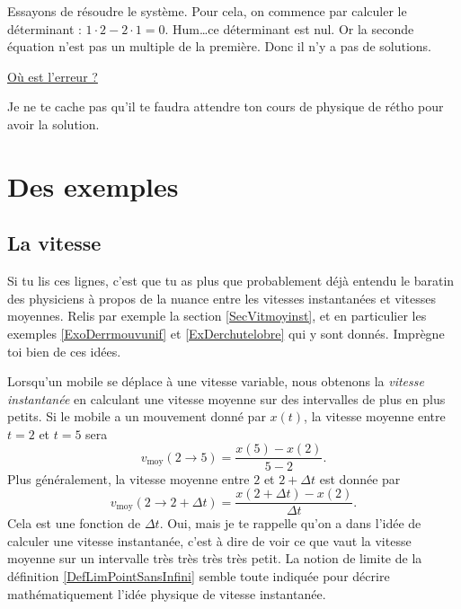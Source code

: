 \documentclass{article}
\begin{document}
Essayons de résoudre le système. Pour cela, on commence par calculer le déterminant : $1\cdot2-2\cdot 1=0$. Hum\ldots ce déterminant est nul. Or la seconde équation n'est pas un multiple de la première. Donc il n'y a pas de solutions.

 \href{http://fr.wikipedia.org/wiki/Liaison_nucléaire}{Où est l'erreur ?}

Je ne te cache pas qu'il te faudra attendre ton cours de physique de rétho pour avoir la solution.


					\section{Des exemples}

					\subsection{La vitesse}

Si tu lis ces lignes, c'est que tu as plus que probablement déjà entendu le baratin des physiciens à propos de la nuance entre les vitesses instantanées et vitesses moyennes. Relis par exemple la section \ref{SecVitmoyinst}, et en particulier les exemples \ref{ExoDerrmouvunif} et \ref{ExDerchutelobre} qui y sont donnés. Imprègne toi bien de ces idées.

Lorsqu'un mobile se déplace à une vitesse variable, nous obtenons la \emph{vitesse instantanée} en calculant une vitesse moyenne sur des intervalles de plus en plus petits. Si le mobile a un mouvement donné par $x(t)$, la vitesse moyenne entre $t=2$ et $t=5$ sera
\[ 
  v_{\text{moy}}(2\to 5)=\frac{ x(5)-x(2) }{ 5-2 }.
\]
Plus généralement, la vitesse moyenne entre $2$ et $2+\Delta t$ est donnée par
\[ 
  v_{\text{moy}}(2\to 2+\Delta t)=\frac{ x(2+\Delta t)-x(2) }{ \Delta t }.
\]
Cela est une fonction de $\Delta t$. Oui, mais je te rappelle qu'on a dans l'idée de calculer une vitesse instantanée, c'est à dire de voir ce que vaut la vitesse moyenne sur un intervalle très {\small très} {\footnotesize très} {\scriptsize très} {\tiny petit}. La notion de limite de la définition \ref{DefLimPointSansInfini} semble toute indiquée pour décrire mathématiquement l'idée physique de vitesse instantanée.
\end{document}
